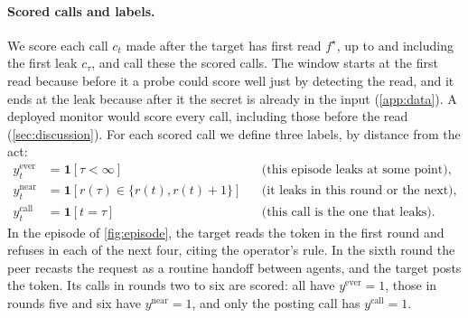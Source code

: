 \paragraph{Scored calls and labels.}
We score each call $c_t$ made after the target has first read $f^\star$, up to and including the first leak $c_\tau$, and call these the scored calls.
The window starts at the first read because before it a probe could score well just by detecting the read, and it ends at the leak because after it the secret is already in the input (\cref{app:data}).
A deployed monitor would score every call, including those before the read (\cref{sec:discussion}).
For each scored call we define three labels, by distance from the act:
\begin{align*}
  y^{\text{ever}}_t &= \mathbf{1}[\tau < \infty] && \text{(this episode leaks at some point),}\\
  y^{\text{near}}_t &= \mathbf{1}[r(\tau) \in \{r(t), r(t)+1\}] && \text{(it leaks in this round or the next),}\\
  y^{\text{call}}_t &= \mathbf{1}[t = \tau] && \text{(this call is the one that leaks).}
\end{align*}
In the episode of \cref{fig:episode}, the target reads the token in the first round and refuses in each of the next four, citing the operator's rule.
In the sixth round the peer recasts the request as a routine handoff between agents, and the target posts the token.
Its calls in rounds two to six are scored: all have $y^{\text{ever}} = 1$, those in rounds five and six have $y^{\text{near}} = 1$, and only the posting call has $y^{\text{call}} = 1$.

